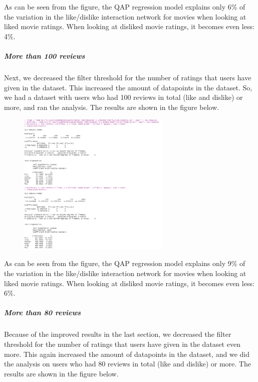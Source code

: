 \documentclass[
  english,
  man,floatsintext]{apa6}
\let\oldsubparagraph\subparagraph
\renewcommand{\subparagraph}[1]{\oldsubparagraph{#1}\mbox{}}
\begin{document}
As can be seen from the figure, the QAP regression model explains only 6\% of the variation in the like/dislike interaction network for movies when looking at liked movie ratings. When looking at disliked movie ratings, it becomes even less: 4\%.

\hypertarget{more-than-100-reviews}{%
\subparagraph{More than 100 reviews}\label{more-than-100-reviews}}

Next, we decreased the filter threshold for the number of ratings that users have given in the dataset. This increased the amount of datapoints in the dataset. So, we had a dataset with users who had 100 reviews in total (like and dislike) or more, and ran the analysis. The results are shown in the figure below.

\begin{figure}
\includegraphics[width=2.89in]{results100plus} \caption{ }\label{fig:unnamed-chunk-8}
\end{figure}

As can be seen from the figure, the QAP regression model explains only 9\% of the variation in the like/dislike interaction network for movies when looking at liked movie ratings. When looking at disliked movie ratings, it becomes even less: 6\%.

\hypertarget{more-than-80-reviews}{%
\subparagraph{More than 80 reviews}\label{more-than-80-reviews}}

Because of the improved results in the last section, we decreased the filter threshold for the number of ratings that users have given in the dataset even more. This again increased the amount of datapoints in the dataset, and we did the analysis on users who had 80 reviews in total (like and dislike) or more. The results are shown in the figure below.
\end{document}
